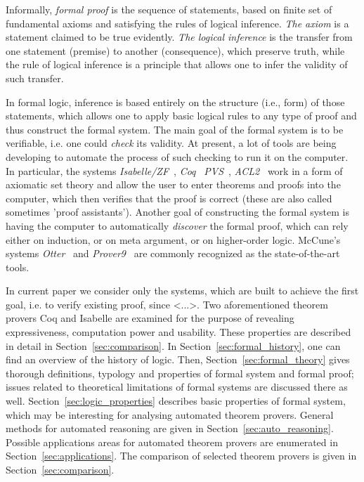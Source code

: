 \documentclass[article]{aaltoseries}
\begin{document}

Informally, \textit{formal proof} is the sequence of statements, based on finite set of fundamental axioms and satisfying the rules of logical inference. \textit{The axiom} is a statement claimed to be true evidently. \textit{The logical inference} is the transfer from one statement (premise) to another (consequence), which preserve truth, while the rule of logical inference is a principle that allows one to infer the validity of such transfer. 

In formal logic, inference is based entirely on the structure (i.e., form) of those statements, which allows one to apply basic logical rules to any type of proof and thus construct the formal system.
The main goal of the formal system is to be verifiable, i.e. one could \textit{check} its validity. At present, a lot of tools are being developing to automate the process of such checking to run it on the computer. In particular, the systems \textit{Isabelle/ZF}~\cite{tool_Isabelle}, \textit{Coq}~\cite{tool_Coq} \textit{PVS}~\cite{tool_Pvs}, \textit{ACL2}~\cite{tool_Acl} work in a form of axiomatic set theory and allow the user to enter theorems and proofs into the computer, which then verifies that the proof is correct (these are also called sometimes 'proof assistants').
Another goal of constructing the formal system is having the computer to automatically \textit{discover} the formal proof, which can rely either on induction, or on meta argument, or on higher-order logic. McCune’s systems \textit{Otter}~\cite{tool_Otter} and \textit{Prover9}~\cite{tool_Prover9} are commonly recognized as the state-of-the-art tools.

In current paper we consider only the systems, which are built to achieve the first goal, i.e. to verify existing proof, since <...>. Two aforementioned theorem provers Coq and Isabelle are examined for the purpose of revealing expressiveness, computation power and usability. These properties are described in detail in Section~\ref{sec:comparison}. 
In Section~\ref{sec:formal_history}, one can find an overview of the history of logic. Then, Section~\ref{sec:formal_theory} gives thorough definitions, typology and properties of formal system and formal proof; issues related to theoretical limitations of formal systems are discussed there as well. Section~\ref{sec:logic_properties} describes basic properties of formal system, which may be interesting for analysing automated theorem provers. General methods for automated reasoning are given in Section~\ref{sec:auto_reasoning}. Possible applications areas for automated theorem provers are enumerated in Section~\ref{sec:applications}. The comparison of selected theorem provers is given in Section~\ref{sec:comparison}.
\end{document}
